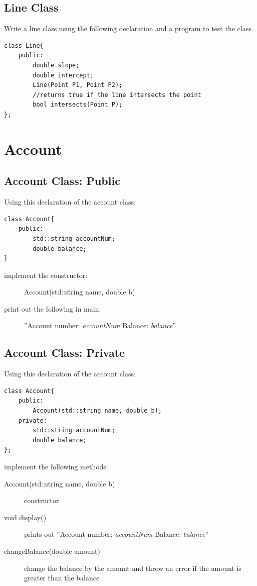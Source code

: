 \documentclass{article}
\begin{document}
\subsection{Line Class}
Write a line class using the following declaration and a program to test the class. 
\begin{verbatim}
class Line{
	public: 
		double slope;
		double intercept;
		Line(Point P1, Point P2);
		//returns true if the line intersects the point
		bool intersects(Point P);
};
\end{verbatim}
\break
\section{Account}
\subsection{Account Class: Public}
Using this declaration of the account class:
\begin{verbatim}
class Account{
    public:
        std::string accountNum;
        double balance;
}
\end{verbatim}
\begin{description}
    \item[implement the constructor:]Account(std::string name, double b) 
    \item[print out the following in main:] ''Account number: \textit{accountNum} Balance: \textit{balance}''
\end{description}

\subsection{Account Class: Private}
Using this declaration of the account class:
\begin{verbatim}
class Account{
    public:
        Account(std::string name, double b);
    private:
        std::string accountNum;
        double balance;
};
\end{verbatim}
implement the following methods:
\begin{description}
    \item [Account(std::string name, double b)]
        constructor
    \item [void display()]
     prints out ''Account number: \textit{accountNum}
     Balance: \textit{balance}''
    \item[changeBalance(double amount)]
    change the balance by the amount and throw an error if the amount
    is greater than the balance
\end{description}
\end{document}
